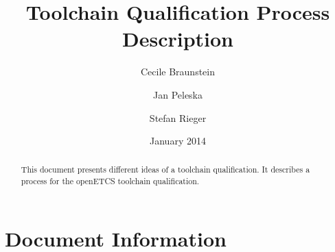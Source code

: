 \documentclass{openetcs_report}
\begin{document}
\frontmatter
{}




\title{Toolchain Qualification Process Description}


\date{January 2014}


\author{Cecile Braunstein \and Jan Peleska}


\author{Stefan Rieger}






\begin{abstract}
This document presents  different ideas of a toolchain
qualification. It describes a process  for the openETCS toolchain
qualification.  
\end{abstract}


\maketitle
\tableofcontents

\newpage

\chapter{Document Information}
\end{document}
